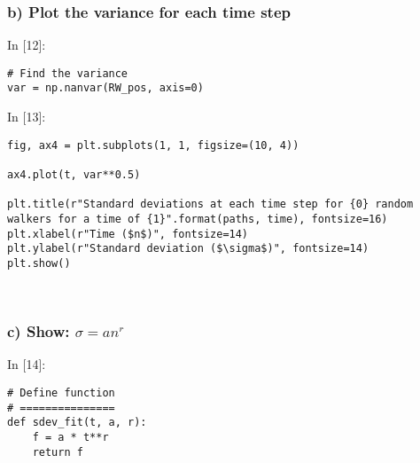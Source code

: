 \documentclass[11pt]{article}
\newif\ifcode
\newif\ifleftmargins
\newlength{\promptlength}
\newcommand{\prompt}[3]{
        \needspace{1.1cm}
        \settowidth{\promptlength}{ #1 [#3] }
        \ifleftmargins\hspace{-\promptlength}\hspace{-5pt}\fi
        {\color{#2}#1 [#3]:}
        \ifleftmargins\vspace{-2.7ex}\fi
    }
\begin{document}
    \hypertarget{b-plot-the-variance-for-each-time-step}{%
\subsubsection{b) Plot the variance for each time
step}\label{b-plot-the-variance-for-each-time-step}}

    
\prompt{In}{incolor}{12}
\codetrue
\begin{tcolorbox}[breakable, size=fbox, boxrule=1pt, pad at break*=1mm, colback=cellbackground, colframe=cellborder]
\begin{verbatim}
# Find the variance
var = np.nanvar(RW_pos, axis=0)
\end{verbatim}
\end{tcolorbox}
\codefalse

    
\prompt{In}{incolor}{13}
\codetrue
\begin{tcolorbox}[breakable, size=fbox, boxrule=1pt, pad at break*=1mm, colback=cellbackground, colframe=cellborder]
\begin{verbatim}
fig, ax4 = plt.subplots(1, 1, figsize=(10, 4))

ax4.plot(t, var**0.5)

plt.title(r"Standard deviations at each time step for {0} random walkers for a time of {1}".format(paths, time), fontsize=16)    
plt.xlabel(r"Time ($n$)", fontsize=14)
plt.ylabel(r"Standard deviation ($\sigma$)", fontsize=14)
plt.show()
\end{verbatim}
\end{tcolorbox}
\codefalse

    \begin{center}
    \end{center}
    { \hspace*{\fill} \\}
    
    \hypertarget{c-show-sigma-anr}{%
\subsubsection{\texorpdfstring{c) Show:
\(\sigma = an^r\)}{c) Show: \textbackslash{}sigma = an\^{}r}}\label{c-show-sigma-anr}}

    
\prompt{In}{incolor}{14}
\codetrue
\begin{tcolorbox}[breakable, size=fbox, boxrule=1pt, pad at break*=1mm, colback=cellbackground, colframe=cellborder]
\begin{verbatim}
# Define function
# ===============
def sdev_fit(t, a, r):
    f = a * t**r
    return f
\end{verbatim}
\end{tcolorbox}
\codefalse
\end{document}
